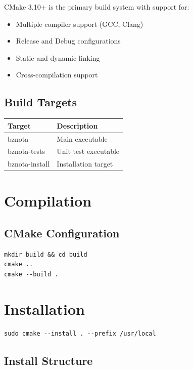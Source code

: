 \documentclass[12pt,a4paper,oneside,openany]{report}
\begin{document}
CMake 3.10+ is the primary build system with support for:

\begin{itemize}
	\item Multiple compiler support (GCC, Clang)
	\item Release and Debug configurations
	\item Static and dynamic linking
	\item Cross-compilation support
\end{itemize}

\subsection{Build Targets}

\begin{table}[H]
	\centering
	\begin{tabular}{|l|p{6cm}|}
		\hline
		\textbf{Target} & \textbf{Description} \\
		\hline
		bznota          & Main executable      \\
		\hline
		bznota-tests    & Unit test executable \\
		\hline
		bznota-install  & Installation target  \\
		\hline
	\end{tabular}
\end{table}

\section{Compilation}

\subsection{CMake Configuration}

\begin{lstlisting}
mkdir build && cd build
cmake ..
cmake --build .
\end{lstlisting}

\section{Installation}

\begin{lstlisting}
sudo cmake --install . --prefix /usr/local
\end{lstlisting}

\subsection{Install Structure}
\end{document}
